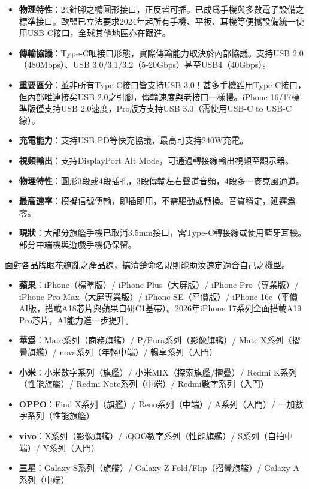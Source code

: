 
\begin{itemize}
  \item \textbf{物理特性}：24針腳之橢圓形接口，正反皆可插。已成爲手機與多數電子設備之標準接口。歐盟已立法要求2024年起所有手機、平板、耳機等便攜設備統一使用USB-C接口，全球其他地區亦在跟進。
  \item \textbf{傳輸協議}：Type-C唯接口形態，實際傳輸能力取決於內部協議。支持USB 2.0（480Mbps）、USB 3.0/3.1/3.2（5-20Gbps）甚至USB4（40Gbps）。
  \item \textbf{重要區分}：並非所有Type-C接口皆支持USB 3.0！甚多手機雖用Type-C接口，但內部唯連接矣USB 2.0之引腳，傳輸速度與老接口一樣慢。iPhone 16/17標準版僅支持USB 2.0速度，Pro版方支持USB 3.0（需使用USB-C to USB-C線）。
  \item \textbf{充電能力}：支持USB PD等快充協議，最高可支持240W充電。
  \item \textbf{視頻輸出}：支持DisplayPort Alt Mode，可通過轉接線輸出視頻至顯示器。
\end{itemize}


\begin{itemize}
  \item \textbf{物理特性}：圓形3段或4段插孔，3段傳輸左右聲道音頻，4段多一麥克風通道。
  \item \textbf{最高速率}：模擬信號傳輸，即插即用，不需驅動或轉換。音質穩定，延遲爲零。
  \item \textbf{現狀}：大部分旗艦手機已取消3.5mm接口，需Type-C轉接線或使用藍牙耳機。部分中端機與遊戲手機仍保留。
\end{itemize}


面對各品牌眼花繚亂之產品線，搞清楚命名規則能助汝速定適合自己之機型。


\begin{itemize}
  \item \textbf{蘋果}：iPhone（標準版）/ iPhone Plus（大屏版）/ iPhone Pro（專業版）/ iPhone Pro Max（大屏專業版）/ iPhone SE（平價版）/ iPhone 16e（平價AI版，搭載A18芯片與蘋果自研C1基帶）。2026年iPhone 17系列全面搭載A19 Pro芯片，AI能力進一步提升。
  \item \textbf{華爲}：Mate系列（商務旗艦）/ P/Pura系列（影像旗艦）/ Mate X系列（摺疊旗艦）/ nova系列（年輕中端）/ 暢享系列（入門）
  \item \textbf{小米}：小米數字系列（旗艦）/ 小米MIX（探索旗艦/摺疊）/ Redmi K系列（性能旗艦）/ Redmi Note系列（中端）/ Redmi數字系列（入門）
  \item \textbf{OPPO}：Find X系列（旗艦）/ Reno系列（中端）/ A系列（入門）/ 一加數字系列（性能旗艦）
  \item \textbf{vivo}：X系列（影像旗艦）/ iQOO數字系列（性能旗艦）/ S系列（自拍中端）/ Y系列（入門）
  \item \textbf{三星}：Galaxy S系列（旗艦）/ Galaxy Z Fold/Flip（摺疊旗艦）/ Galaxy A系列（中端）
\end{itemize}

